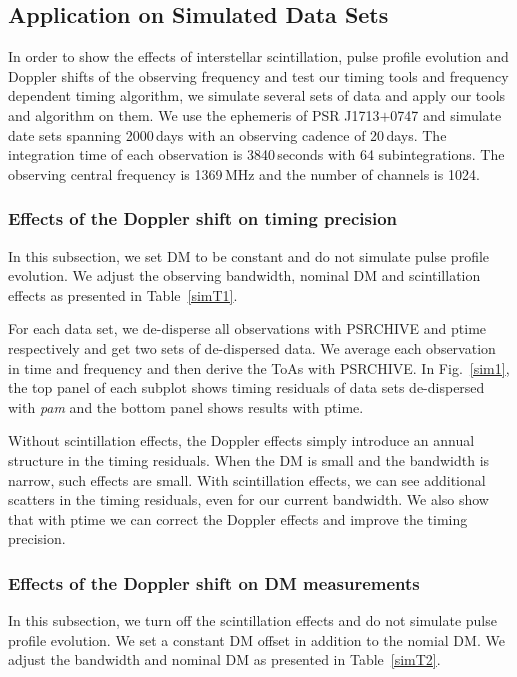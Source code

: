 \documentclass[useAMS,usenatbib]{mn2e}
\begin{document}
\subsection{Application on Simulated Data Sets}

In order to show the effects of interstellar scintillation, pulse profile evolution 
and Doppler shifts of the observing frequency and test our timing tools and frequency 
dependent timing algorithm, we simulate several sets of data and apply our tools 
and algorithm on them.
%
We use the ephemeris of PSR J1713$+$0747 and simulate date sets spanning 2000\,days 
with an observing cadence of 20\,days. 
%
The integration time of each observation is 3840\,seconds with 64 subintegrations.
The observing central frequency is 1369\,MHz and the number of channels is 1024.

\subsubsection{Effects of the Doppler shift on timing precision}

In this subsection, we set DM to be constant and do not simulate pulse profile evolution.
%
We adjust the observing bandwidth, nominal DM and scintillation effects as presented in 
Table~\ref{simT1}.

For each data set, we de-disperse all observations with PSRCHIVE and ptime respectively and 
get two sets of de-dispersed data. We average each observation in time and frequency and 
then derive the ToAs with PSRCHIVE. In Fig.~\ref{sim1}, the top panel of each subplot shows 
timing residuals of data sets de-dispersed with \textit{pam} and the bottom panel shows results 
with ptime.

Without scintillation effects, the Doppler effects simply introduce an annual structure 
in the timing residuals. When the DM is small and the bandwidth is narrow, such effects are 
small.
%
With scintillation effects, we can see additional scatters in the timing residuals, even
for our current bandwidth.
%
We also show that with ptime we can correct the Doppler effects and improve the 
timing precision.

\subsubsection{Effects of the Doppler shift on DM measurements}

In this subsection, we turn off the scintillation effects and do not simulate pulse profile evolution.
%
We set a constant DM offset in addition to the nomial DM. 
We adjust the bandwidth and nominal DM as presented in Table~\ref{simT2}.
\end{document}
